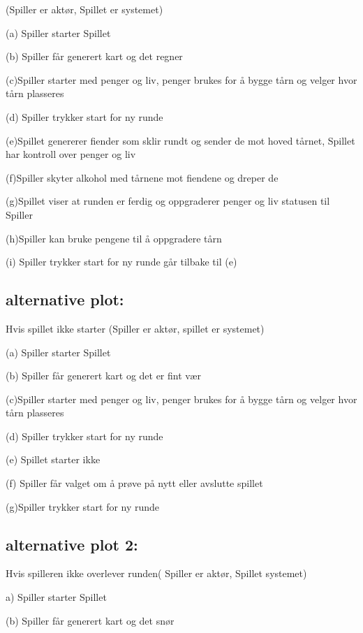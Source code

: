 \documentclass[norsk,a4paper,12 pt]{article}
\begin{document}
 (Spiller er aktør, Spillet er systemet)


(a) Spiller starter Spillet

(b) Spiller får generert kart og det regner

(c)Spiller starter med penger og liv, penger brukes for å bygge tårn og velger hvor tårn plasseres

(d) Spiller trykker start for ny runde

(e)Spillet genererer fiender som sklir rundt og sender de mot hoved tårnet, Spillet har kontroll over penger og liv

(f)Spiller skyter alkohol med tårnene mot fiendene og dreper de

(g)Spillet viser at runden er ferdig og oppgraderer penger og liv statusen til Spiller

(h)Spiller kan bruke pengene til å oppgradere tårn

(i) Spiller trykker start for ny runde går tilbake til (e) 



\subsection{ alternative plot:}

Hvis spillet ikke starter (Spiller er aktør, spillet er systemet)


(a) Spiller starter Spillet

(b) Spiller får generert kart og det er fint vær

(c)Spiller starter med penger og liv, penger brukes for å bygge tårn og velger hvor tårn plasseres

(d) Spiller trykker start for ny runde

(e) Spillet starter ikke

(f) Spiller får valget om å prøve på nytt eller avslutte spillet

(g)Spiller trykker start for ny runde



\subsection{ alternative plot 2:}

Hvis spilleren ikke overlever runden( Spiller er aktør, Spillet systemet)



a) Spiller starter Spillet

(b) Spiller får generert kart og det snør
\end{document}
